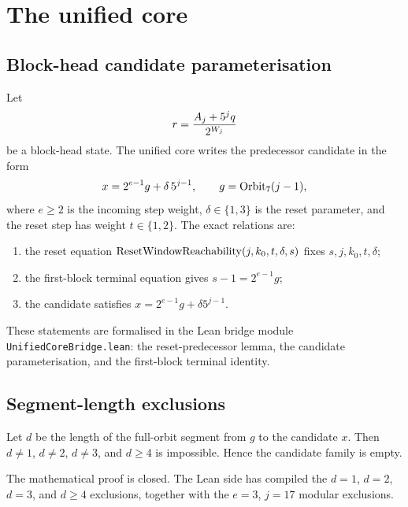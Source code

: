 \section{The unified core}\label{sec:core}

\subsection{Block-head candidate parameterisation}

Let
\begin{equation*}
  r=\frac{A_j+5^j q}{2^{W_j}}
\end{equation*}
be a block-head state.  The unified core writes the predecessor
candidate in the form
\begin{equation*}
  x=2^{e-1}g+\delta\,5^{j-1},
\qquad g=\mathrm{Orbit}_7(j-1),
\end{equation*}
where $e\ge2$ is the incoming step weight, $\delta\in\{1,3\}$ is the
reset parameter, and the reset step has weight $t\in\{1,2\}$.  The exact
relations are:
\begin{enumerate}[leftmargin=*]
\item the reset equation
  $\mathrm{ResetWindowReachability}(j,k_0,t,\delta,s)$ fixes $s,j,k_0,t,\delta$;
\item the first-block terminal equation gives
  $s-1=2^{e-1}g$;
\item the candidate satisfies
  $x=2^{e-1}g+\delta 5^{j-1}$.
\end{enumerate}

These statements are formalised in the Lean bridge module
\texttt{UnifiedCoreBridge.lean}: the reset-predecessor lemma, the
candidate parameterisation, and the first-block terminal identity.

\subsection{Segment-length exclusions}

\begin{lemma}\label{lem:segments}
Let $d$ be the length of the full-orbit segment from $g$ to the
candidate $x$.  Then $d\ne1$, $d\ne2$, $d\ne3$, and $d\ge4$ is
impossible.  Hence the candidate family is empty.
\end{lemma}

\begin{remark}
The mathematical proof is closed.  The Lean side has compiled the
$d=1$, $d=2$, $d=3$, and $d\ge4$ exclusions, together with the
$e=3$, $j=17$ modular exclusions.
\end{remark}

